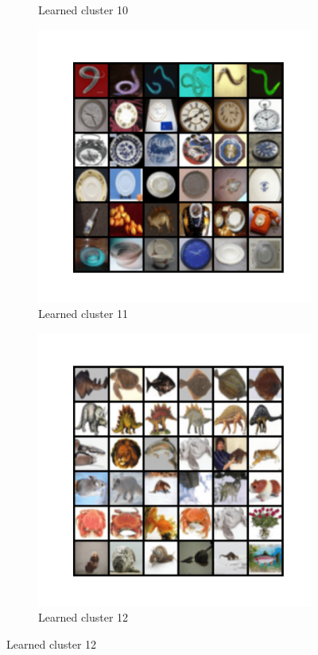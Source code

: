 \documentclass[10pt,twocolumn,letterpaper]{article}
\begin{document}
\begin{figure}
\begin{subfigure}{0.32\textwidth}
       \caption{Learned cluster 10}
     \end{subfigure}
     \hfill
     \begin{subfigure}{0.32\textwidth}
       \includegraphics[width=\linewidth,trim={1cm 2cm 1cm 2cm},clip]{figures/experiments/cifar100_cluster/nearest_class10.png}
       \caption{Learned cluster 11}
     \end{subfigure}
     \hfill
     \begin{subfigure}{0.32\textwidth}
       \includegraphics[width=\linewidth,trim={1cm 2cm 1cm 2cm},clip]{figures/experiments/cifar100_cluster/nearest_class11.png}
       \caption{Learned cluster 12}
     \end{subfigure}
   \end{figure}  
\end{document}
